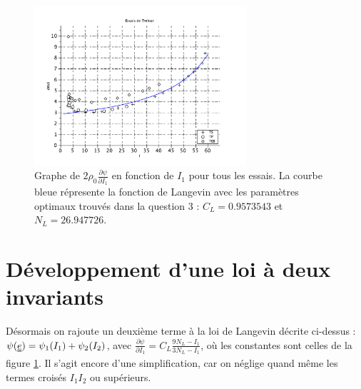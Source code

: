 \documentclass[a4paper,11pt]{article}
\newcommand{\tens}{\uuline}
\begin{document}
\begin{figure}[ht]
\centering
\includegraphics[width=0.7\textwidth]{scilab_prof/q32.pdf}
\caption{Graphe de $2 \rho_0 \frac{\partial\psi}{\partial I_1}$ en fonction de $I_1$ pour tous les essais. La courbe bleue répresente la fonction de Langevin avec les paramètres optimaux trouvés dans la question 3 : $C_L = 0.9573543$ et $N_L=26.947726$.}
\label{fig:32}
\end{figure}

\section{Développement d'une loi à deux invariants}
Désormais on rajoute un deuxième terme à la loi de Langevin décrite ci-dessus : $\psi(\tens{e}) = \psi_1(I_1) + \psi_2(I_2)$, avec $\frac{\partial\psi}{\partial I_1} = C_L\frac{9N_L-I_1}{3N_L-I_1}$, où les constantes sont celles de la figure \ref{fig:32}. Il s'agit encore d'une simplification, car on néglige quand même les termes croisés $I_1I_2$ ou supérieurs.
\end{document}
